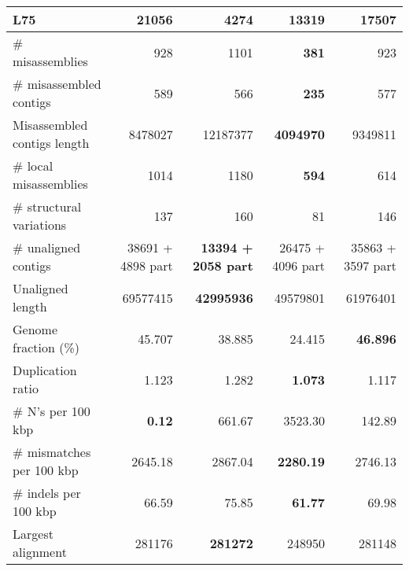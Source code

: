 \documentclass[12pt,a4paper]{article}
\begin{document}
\begin{table}[ht]
\begin{center}
\begin{tabular}{|l*{4}{|r}|}
L75 & 21056 & {\bf 4274} & 13319 & 17507 \\ \hline
\# misassemblies & 928 & 1101 & {\bf 381} & 923 \\ \hline
\# misassembled contigs & 589 & 566 & {\bf 235} & 577 \\ \hline
Misassembled contigs length & 8478027 & 12187377 & {\bf 4094970} & 9349811 \\ \hline
\# local misassemblies & 1014 & 1180 & {\bf 594} & 614 \\ \hline
\# structural variations & 137 & 160 & 81 & 146 \\ \hline
\# unaligned contigs & 38691 + 4898 part & {\bf 13394 + 2058 part} & 26475 + 4096 part & 35863 + 3597 part \\ \hline
Unaligned length & 69577415 & {\bf 42995936} & 49579801 & 61976401 \\ \hline
Genome fraction (\%) & 45.707 & 38.885 & 24.415 & {\bf 46.896} \\ \hline
Duplication ratio & 1.123 & 1.282 & {\bf 1.073} & 1.117 \\ \hline
\# N's per 100 kbp & {\bf 0.12} & 661.67 & 3523.30 & 142.89 \\ \hline
\# mismatches per 100 kbp & 2645.18 & 2867.04 & {\bf 2280.19} & 2746.13 \\ \hline
\# indels per 100 kbp & 66.59 & 75.85 & {\bf 61.77} & 69.98 \\ \hline
Largest alignment & 281176 & {\bf 281272} & 248950 & 281148 \\ \hline
\end{tabular}
\end{center}
\end{table}
\end{document}
